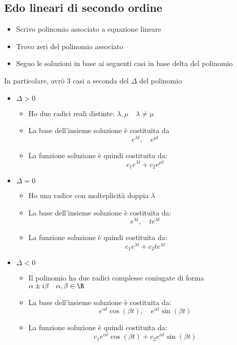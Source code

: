 \subsection{Edo lineari di secondo ordine}
\label{edol2}
\begin{itemize}
	\item Scrivo polinomio associato a equazione lineare
	\item Trovo zeri del polinomio associato
	\item Seguo le soluzioni in base ai seguenti casi in base delta del polinomio
\end{itemize}
In particolare, avrò 3 casi a seconda del $ \Delta  $ del polinomio
\begin{itemize}
	\item $ \Delta  > 0 $
	      \begin{itemize}
		      \item Ho due radici reali distinte: $ \lambda , \mu \quad \lambda \neq \mu  $
		      \item La base dell'insieme soluzione è costituita da
		            \[
			            e^{\lambda t} , \quad e^{\mu t}
		            \]
		      \item La funzione soluzione è quindi costituita da:
		            \[
			            c_1e^{\lambda t} + c_2e^{\mu t}
		            \]
	      \end{itemize}
	\item $ \Delta =0 $
	      \begin{itemize}
		      \item Ho una radice con molteplicità doppia $ \lambda  $
		      \item La base dell'insieme soluzione è costituita da:
		            \[
			            e^{\lambda  t}, \quad te^{\lambda t}
		            \]
		      \item La funzione soluzione è quindi costituita da:
		            \[
			            c_1e^{\lambda t} + c_2te^{\lambda  t}
		            \]
	      \end{itemize}
	\item $ \Delta <0 $
	      \begin{itemize}
		      \item Il polinomio ha due radici complesse coniugate di forma $ \alpha  \pm i \beta \quad \alpha ,\beta  \in  \R $
		      \item La base dell'insieme soluzione è costituita da:
		            \[
			            e^{\alpha t}\cos \left( \beta  t \right) , \quad  e ^{\alpha t}\sin \left( \beta t \right)
		            \]
		      \item La funzione soluzione è quindi costituita da:
		            \[
			            c_1 e^{\alpha t}\cos \left( \beta  t \right)  +c_2 e ^{\alpha t}\sin \left( \beta t \right)
		            \]
	      \end{itemize}
\end{itemize}
